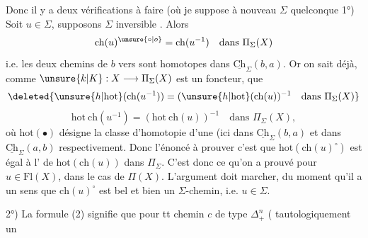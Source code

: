 Donc il y a deux vérifications à faire (où je suppose à nouveau $\Sigma$ quelconque
1°) Soit $u\in\Sigma$,  supposons $\Sigma$ inversible . Alors
\[\mathrm{ch}(u)^{\unsure{\circ|o}}=\mathrm{ch}(u^{-1})\quad\text{dans }\Pi_\Sigma(X)\]
i.e. les deux chemins de $b$ vers
sont homotopes dans $\underline{\mathrm{Ch}}_\Sigma(b,a)$. Or on sait déjà,  comme $\unsure{k|K}:X\longrightarrow\Pi_\Sigma(X)$ est un foncteur, que
\[\deleted{\unsure{h|\mathrm{hot}}(\mathrm{ch}(u^{-1}))=(\unsure{h|\mathrm{hot}}(\mathrm{ch}(u))^{-1}\quad\text{dans }\Pi_\Sigma(X)}\]
\[\mathrm{hot}\ \mathrm{ch}(u^{-1})=(\mathrm{hot}\ \mathrm{ch}(u))^{-1}\quad\text{dans }\Pi_\Sigma(X),\]
où $\mathrm{hot}(\bullet)$ désigne la classe d'homotopie d'une  (ici  dans $\underline{\mathrm{Ch}}_\Sigma(b,a)$  et dans $\underline{\mathrm{Ch}}_\Sigma(a,b)$ respectivement. Donc l'énoncé à prouver c'est que $\mathrm{hot}(\mathrm{ch}(u)^\circ)$ est égal à l' de $\mathrm{hot}(\mathrm{ch}(u))$ dans $\Pi_\Sigma$. C'est donc ce qu'on a prouvé pour \uline{} $u\in\mathrm{Fl}(X)$, dans le cas de $\Pi(X)$. L'argument doit marcher, du moment qu'il a un sens  que $\mathrm{ch}(u)^\circ$ est bel et bien un $\Sigma$-chemin, i.e. $u\in\Sigma$.

2°) La formule (2) signifie que pour tt chemin $c$ de type $\Delta_+^n$ ( tautologiquement un
